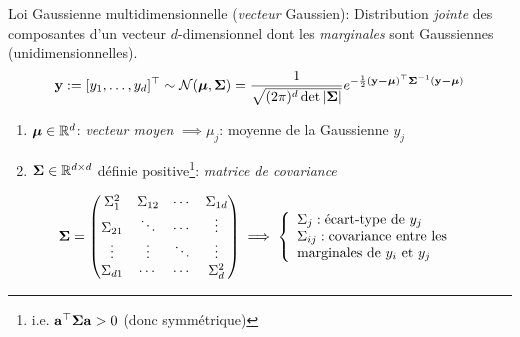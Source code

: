 \documentclass[xcolor=svgnames, t]{beamer}
\newcommand{\vectorx}[1]{\boldsymbol{\MakeLowercase{\mathbf{#1}}}}
\newcommand{\matrixx}[1]{\boldsymbol{\MakeUppercase{#1}}}
\newcommand{\coloredemph}[1]{\textcolor{internationalblue}{\emph{#1}}}
\begin{document}
\begin{frame}
  \frametitle{\secname}

  Loi Gaussienne multidimensionnelle (\coloredemph{vecteur} Gaussien): Distribution \coloredemph{jointe} des composantes d'un vecteur $d$-dimensionnel dont les \coloredemph{marginales} sont Gaussiennes (unidimensionnelles).
  \begin{equation*}
    \vectorx{Y} := [ y_1, \dots, y_d ]^\top  \sim \mathcal{N}(\vectorx{\mu} , \matrixx{\Sigma}) =  \frac{1}{\sqrt{(2 \pi)^d \det |\matrixx{\Sigma}|}} e^{-\frac{1}{2}(\vectorx{y - \mu})^\top \matrixx{\Sigma}^{-1} (\vectorx{y - \mu})}
  \end{equation*}
% 
  \begin{enumerate}
    \item $\vectorx{\mu} \in \mathbb{R}^d$: \coloredemph{vecteur moyen} $\implies \mu_j$: moyenne de la Gaussienne $y_j$
    \item $\matrixx{\Sigma} \in \mathbb{R}^{d \times d}$ définie positive\footnote{i.e. $\vectorx{a}^\top \matrixx{\Sigma} \vectorx{a} > 0$ (donc symmétrique)}: \coloredemph{matrice de covariance}
  \end{enumerate}
% 
  \pause
  \begin{equation*}
    \matrixx{\Sigma}
    =
    \begin{pmatrix} 
      \Sigma^2_{1}  & \Sigma_{{1}{2}} &  \cdots & \Sigma_{{1}{d}} \\
      \Sigma_{{2}{1}} & \ddots          & \cdots  & \vdots \\
      \vdots          & \vdots          & \ddots  & \vdots \\
      \Sigma_{{d}{1}} & \cdots          & \cdots  &  \Sigma^2_{d} 
      \end{pmatrix}
    \implies
    \left\{
      \begin{array}{ll}
        \Sigma_j  : \text{écart-type} \text{ de } y_j\\
        \Sigma_{ij} : \text{covariance entre les } \\
        \text{marginales de } y_i \text{ et } y_j
      \end{array}
    \right.
  \end{equation*}

\end{frame}
\end{document}
